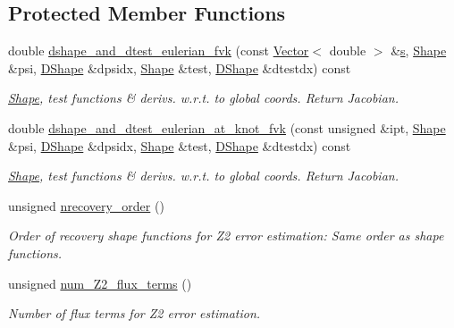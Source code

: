 \subsection*{Protected Member Functions}
\begin{DoxyCompactItemize}
\item 
double \hyperlink{classoomph_1_1TDisplacementBasedFoepplvonKarmanElement_a1df4d4f099c7a710a1c43004266e4ea7}{dshape\+\_\+and\+\_\+dtest\+\_\+eulerian\+\_\+fvk} (const \hyperlink{classoomph_1_1Vector}{Vector}$<$ double $>$ \&\hyperlink{cfortran_8h_ab7123126e4885ef647dd9c6e3807a21c}{s}, \hyperlink{classoomph_1_1Shape}{Shape} \&psi, \hyperlink{classoomph_1_1DShape}{D\+Shape} \&dpsidx, \hyperlink{classoomph_1_1Shape}{Shape} \&test, \hyperlink{classoomph_1_1DShape}{D\+Shape} \&dtestdx) const
\begin{DoxyCompactList}\small\item\em \hyperlink{classoomph_1_1Shape}{Shape}, test functions \& derivs. w.\+r.\+t. to global coords. Return Jacobian. \end{DoxyCompactList}\item 
double \hyperlink{classoomph_1_1TDisplacementBasedFoepplvonKarmanElement_ad690f5dcab636d760f70779bdb60bd4e}{dshape\+\_\+and\+\_\+dtest\+\_\+eulerian\+\_\+at\+\_\+knot\+\_\+fvk} (const unsigned \&ipt, \hyperlink{classoomph_1_1Shape}{Shape} \&psi, \hyperlink{classoomph_1_1DShape}{D\+Shape} \&dpsidx, \hyperlink{classoomph_1_1Shape}{Shape} \&test, \hyperlink{classoomph_1_1DShape}{D\+Shape} \&dtestdx) const
\begin{DoxyCompactList}\small\item\em \hyperlink{classoomph_1_1Shape}{Shape}, test functions \& derivs. w.\+r.\+t. to global coords. Return Jacobian. \end{DoxyCompactList}\item 
unsigned \hyperlink{classoomph_1_1TDisplacementBasedFoepplvonKarmanElement_afe81136b4a28e8e61210af5d880fcf72}{nrecovery\+\_\+order} ()
\begin{DoxyCompactList}\small\item\em Order of recovery shape functions for Z2 error estimation\+: Same order as shape functions. \end{DoxyCompactList}\item 
unsigned \hyperlink{classoomph_1_1TDisplacementBasedFoepplvonKarmanElement_a19b93ec7635583382906d2911996ddfd}{num\+\_\+\+Z2\+\_\+flux\+\_\+terms} ()
\begin{DoxyCompactList}\small\item\em Number of \textquotesingle{}flux\textquotesingle{} terms for Z2 error estimation. \end{DoxyCompactList}\item 

\end{DoxyCompactItemize}
